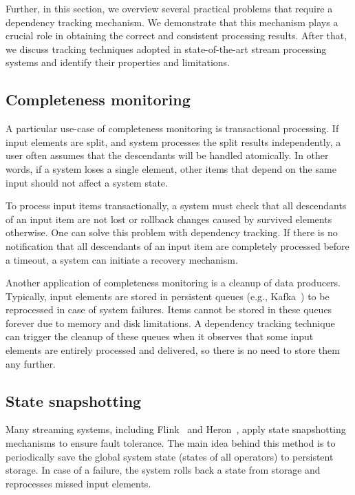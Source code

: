 Further, in this section, we overview several practical problems that require a dependency tracking mechanism. We demonstrate that this mechanism plays a crucial role in obtaining the correct and consistent processing results. After that, we discuss tracking techniques adopted in state-of-the-art stream processing systems and identify their properties and limitations. 

\subsection{Completeness monitoring}

A particular use-case of completeness monitoring is transactional processing. If input elements are split, and system processes the split results independently, a user often assumes that the descendants will be handled atomically. In other words, if a system loses a single element, other items that depend on the same input should not affect a system state. 

To process input items transactionally, a system must check that all descendants of an input item are not lost or rollback changes caused by survived elements otherwise. One can solve this problem with dependency tracking. If there is no notification that all descendants of an input item are completely processed before a timeout, a system can initiate a recovery mechanism.

Another application of completeness monitoring is a cleanup of data producers. Typically, input elements are stored in persistent queues (e.g., Kafka~\cite{kreps2011kafka}) to be reprocessed in case of system failures. Items cannot be stored in these queues forever due to memory and disk limitations. A dependency tracking technique can trigger the cleanup of these queues when it observes that some input elements are entirely processed and delivered, so there is no need to store them any further.

\subsection{State snapshotting}
Many streaming systems, including Flink~\cite{Carbone:2017:SMA:3137765.3137777} and Heron~\cite{Kulkarni:2015:THS:2723372.2742788}, apply state snapshotting mechanisms to ensure fault tolerance. The main idea behind this method is to periodically save the global system state (states of all operators) to persistent storage. In case of a failure, the system rolls back a state from storage and reprocesses missed input elements. 

